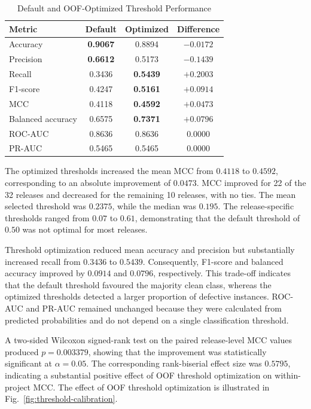 \documentclass[conference]{IEEEtran}
\begin{document}
\begin{table}[H]
\caption{Default and OOF-Optimized Threshold Performance}
\label{tab:threshold-comparison}
\centering
\setlength{\tabcolsep}{5pt}
\begin{tabular}{lccc}
\hline
\textbf{Metric} &
\textbf{Default} &
\textbf{Optimized} &
\textbf{Difference} \\
\hline
Accuracy          & \textbf{0.9067} & 0.8894 & $-0.0172$ \\
Precision         & \textbf{0.6612} & 0.5173 & $-0.1439$ \\
Recall            & 0.3436 & \textbf{0.5439} & $+0.2003$ \\
F1-score          & 0.4247 & \textbf{0.5161} & $+0.0914$ \\
MCC               & 0.4118 & \textbf{0.4592} & $+0.0473$ \\
Balanced accuracy & 0.6575 & \textbf{0.7371} & $+0.0796$ \\
ROC-AUC           & 0.8636 & 0.8636 & $0.0000$ \\
PR-AUC            & 0.5465 & 0.5465 & $0.0000$ \\
\hline
\end{tabular}
\end{table}

The optimized thresholds increased the mean MCC from \(0.4118\) to
\(0.4592\), corresponding to an absolute improvement of \(0.0473\).
MCC improved for 22 of the 32 releases and decreased for the remaining
10 releases, with no ties. The mean selected threshold was \(0.2375\),
while the median was \(0.195\). The release-specific thresholds ranged
from \(0.07\) to \(0.61\), demonstrating that the default threshold of
\(0.50\) was not optimal for most releases.

Threshold optimization reduced mean accuracy and precision but
substantially increased recall from \(0.3436\) to \(0.5439\).
Consequently, F1-score and balanced accuracy improved by \(0.0914\)
and \(0.0796\), respectively. This trade-off indicates that the default
threshold favoured the majority clean class, whereas the optimized
thresholds detected a larger proportion of defective instances.
ROC-AUC and PR-AUC remained unchanged because they were calculated
from predicted probabilities and do not depend on a single
classification threshold.

A two-sided Wilcoxon signed-rank test on the paired release-level MCC
values produced \(p=0.003379\), showing that the improvement was
statistically significant at \(\alpha=0.05\). The corresponding
rank-biserial effect size was \(0.5795\), indicating a substantial
positive effect of OOF threshold optimization on within-project MCC.
The effect of OOF threshold optimization is illustrated in
Fig.~\ref{fig:threshold-calibration}.
\end{document}
